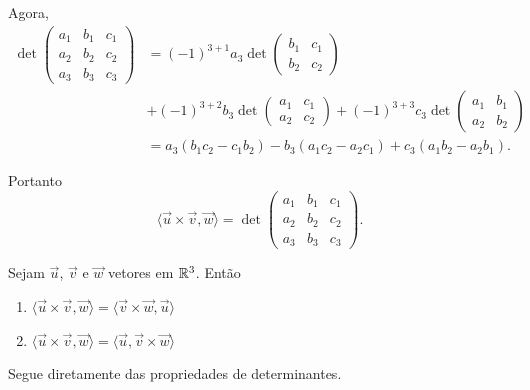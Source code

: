 Agora,
\begin{align*}
    \det \begin{pmatrix}
             a_1 & b_1 & c_1 \\
             a_2 & b_2 & c_2 \\
             a_3 & b_3 & c_3
         \end{pmatrix} & = (-1)^{3+1}a_3\det \begin{pmatrix}
                                                 b_1 & c_1 \\
                                                 b_2 & c_2
                                             \end{pmatrix} \\ &+ (-1)^{3+2}b_3\det \begin{pmatrix}
        a_1 & c_1 \\
        a_2 & c_2
    \end{pmatrix} + (-1)^{3+3}c_3\det \begin{pmatrix}
        a_1 & b_1 \\
        a_2 & b_2
    \end{pmatrix}\\ &= a_3(b_1c_2 - c_1b_2) - b_3(a_1c_2 - a_2c_1) + c_3(a_1b_2 - a_2b_1).
\end{align*}

Portanto
\begin{equation}
    \langle\vec{u}\times\vec{v}, \vec{w}\rangle = \det \begin{pmatrix}
        a_1 & b_1 & c_1 \\
        a_2 & b_2 & c_2 \\
        a_3 & b_3 & c_3
    \end{pmatrix}.
\end{equation}

\begin{proposicao}
    Sejam $\vec{u}$, $\vec{v}$ e $\vec{w}$ vetores em $\mathbb{R}^3$. Então
    \begin{enumerate}[label=({\alph*})]
        \item $\langle\vec{u}\times\vec{v}, \vec{w}\rangle = \langle\vec{v}\times\vec{w}, \vec{u}\rangle$
        \item $\langle\vec{u}\times\vec{v}, \vec{w}\rangle = \langle\vec{u}, \vec{v}\times\vec{w}\rangle$
    \end{enumerate}
\end{proposicao}
\begin{prova}
    Segue diretamente das propriedades de determinantes.
\end{prova}

